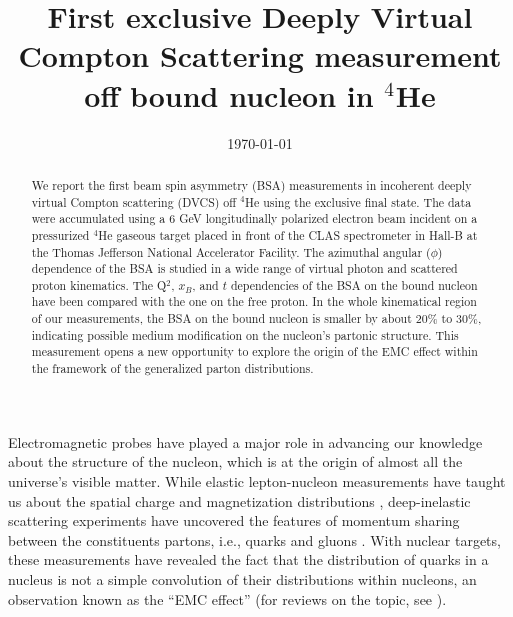 \documentclass[twocolumn,nofootinbib,showpacs,prl,superscriptaddress,secnumarabic,amssymb,nobibnotes,aps,floatfix]{revtex4}
\begin{document}
\linenumbers

\title{First exclusive Deeply Virtual Compton Scattering measurement off bound nucleon in $^4$He}



\date{\today}
\begin{abstract}
 We report the first beam spin asymmetry (BSA) measurements in incoherent 
   deeply virtual Compton scattering (DVCS) off $^4$He using the exclusive 
   final state. The data were accumulated using a 6 GeV longitudinally 
   polarized electron beam incident on a pressurized $^4$He gaseous target 
   placed in front of the CLAS spectrometer in Hall-B at the Thomas Jefferson 
   National Accelerator Facility. The azimuthal angular ($\phi$) dependence of 
   the BSA is studied in a wide range of virtual photon and scattered proton 
   kinematics. The Q$^2$, $x_B$, and $t$ dependencies of the BSA on the bound 
   nucleon have been compared with the one on the free proton. In the whole 
   kinematical region of our measurements, the BSA on the bound nucleon is 
   smaller by about $20\%$ to $30\%$, indicating possible medium modification 
   on the nucleon's partonic structure.  This measurement opens a new 
   opportunity to explore the origin of the EMC effect within the framework of 
   the generalized parton distributions.

\end{abstract}

\maketitle 

Electromagnetic probes have played a major role in advancing our knowledge 
about the structure of the nucleon, which is at the origin of almost all the
universe's visible matter. While elastic lepton-nucleon measurements have 
taught us about the spatial charge and magnetization distributions 
\cite{Hofstadter:1955ae,Perdrisat:2006hj}, deep-inelastic scattering 
experiments have uncovered the features of momentum sharing between the 
constituents partons, i.e., quarks and gluons \cite{Dokshitzer:1977sg,pdg}.  
With nuclear targets, these measurements have revealed the fact that the 
distribution of quarks in a nucleus is not a simple convolution of 
their distributions within nucleons, an observation known as the ``EMC 
effect''\cite{EMC_first} (for reviews on the topic, see  
\cite{EMC_CERN,EMC_SLAC,EMC_HERMES,EMC_JLab,EMC_John,EMC_mdeium_1,EMC_medium_2}).
\end{document}
